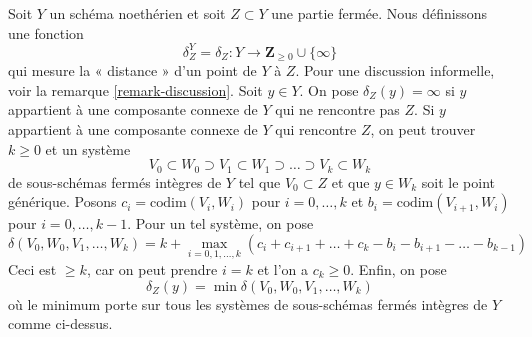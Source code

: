 \noindent
Soit $Y$ un schéma noethérien et soit $Z \subset Y$ une partie fermée.
Nous définissons une fonction
\begin{equation}
\label{equation-delta-Z}
\delta^Y_Z = \delta_Z : Y \longrightarrow \mathbf{Z}_{\geq 0} \cup \{\infty\}
\end{equation}
qui mesure la « distance » d'un point de $Y$ à $Z$.
Pour une discussion informelle, voir la remarque \ref{remark-discussion}.
Soit $y \in Y$. On pose $\delta_Z(y) = \infty$ si $y$ appartient
à une composante connexe de $Y$ qui ne rencontre pas $Z$.
Si $y$ appartient à une composante connexe de $Y$ qui rencontre $Z$,
on peut trouver $k \geq 0$ et un système
$$
V_0 \subset W_0 \supset V_1 \subset W_1 \supset \ldots \supset
V_k \subset W_k
$$
de sous-schémas fermés intègres de $Y$ tel que $V_0 \subset Z$
et que $y \in W_k$ soit le point générique. Posons
$c_i = \text{codim}(V_i, W_i)$ pour $i = 0, \ldots, k$
et $b_i = \text{codim}(V_{i + 1}, W_i)$ pour $i = 0, \ldots, k - 1$.
Pour un tel système, on pose
$$
\delta(V_0, W_0, V_1, \ldots, W_k) =
k +
\max_{i = 0, 1, \ldots, k}
(c_i + c_{i + 1} + \ldots + c_k - b_i - b_{i + 1} - \ldots - b_{k - 1})
$$
Ceci est $\geq k$, car on peut prendre $i = k$ et l'on a $c_k \geq 0$.
Enfin, on pose
$$
\delta_Z(y) = \min \delta(V_0, W_0, V_1, \ldots, W_k)
$$
où le minimum porte sur tous les systèmes de sous-schémas fermés intègres de $Y$
comme ci-dessus.

